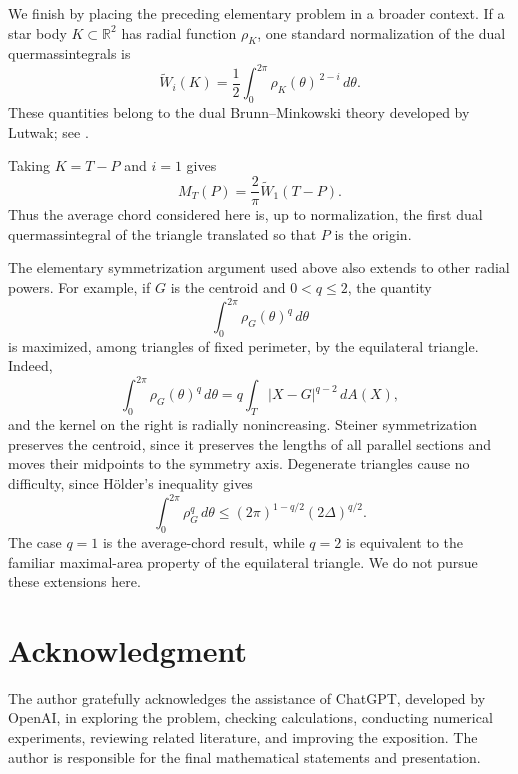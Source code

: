 \documentclass[11pt]{article}
\theoremstyle{remark}
\newcommand{\area}{\Delta}
\begin{document}
We finish by placing the preceding elementary problem in a broader
context.  If a star body $K\subset\mathbb R^2$ has radial function
$\rho_K$, one standard normalization of the dual quermassintegrals is
\[
 \widetilde W_i(K)
 =
 \frac12\int_0^{2\pi}\rho_K(\theta)^{\,2-i}\,d\theta.
\]
These quantities belong to the dual Brunn--Minkowski theory developed
by Lutwak; see \cite{Lutwak}.

Taking $K=T-P$ and $i=1$ gives
\[
 {
 M_T(P)=\frac{2}{\pi}\widetilde W_1(T-P).
 }
\]
Thus the average chord considered here is, up to normalization, the
first dual quermassintegral of the triangle translated so that $P$ is
the origin.

The elementary symmetrization argument used above also extends to
other radial powers.  For example, if $G$ is the centroid and
$0<q\le2$, the quantity
\[
 \int_0^{2\pi}\rho_G(\theta)^q\,d\theta
\]
is maximized, among triangles of fixed perimeter, by the equilateral
triangle.  Indeed,
\[
 \int_0^{2\pi}\rho_G(\theta)^q\,d\theta
 =
 q\int_T |X-G|^{q-2}\,dA(X),
\]
and the kernel on the right is radially nonincreasing.  Steiner
symmetrization preserves the centroid, since it preserves the lengths
of all parallel sections and moves their midpoints to the symmetry
axis.  Degenerate triangles cause no difficulty, since H\"older's
inequality gives
\[
 \int_0^{2\pi}\rho_G^q\,d\theta
 \le
 (2\pi)^{1-q/2}(2\area)^{q/2}.
\]
The case $q=1$ is the average-chord result, while $q=2$ is equivalent
to the familiar maximal-area property of the equilateral triangle.
We do not pursue these extensions here.

\section*{Acknowledgment}

The author gratefully acknowledges the assistance of ChatGPT, developed by
OpenAI, in exploring the problem, checking calculations, conducting numerical
experiments, reviewing related literature, and improving the exposition.
The author is responsible for the final mathematical statements and presentation.
\end{document}
